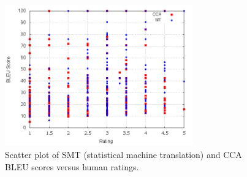 \documentclass[letterpaper]{article}
\begin{document}
\begin{figure}
\includegraphics[width=3.2in]{plot/plot.png}
\caption{Scatter plot of SMT (statistical machine translation) and CCA BLEU scores versus human ratings.\label{fig:scatter-plot}}
\end{figure}
\end{document}
